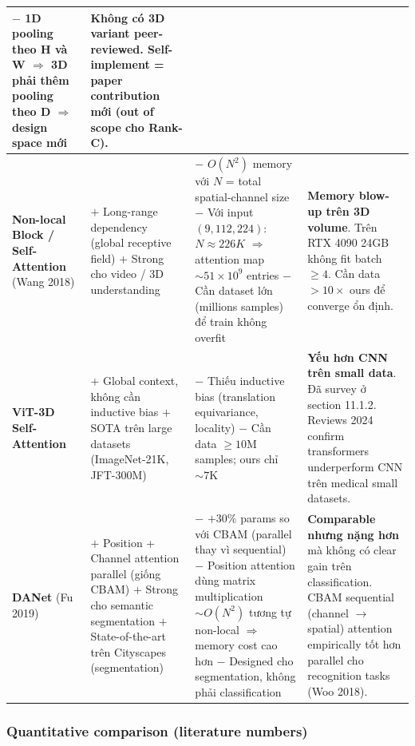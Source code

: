 \documentclass[11pt,a4paper]{article}
\newcommand{\bad}[1]{\textcolor{bad}{#1}}
\begin{document}
\begin{longtable}{@{}p{2.2cm}p{4.2cm}p{4.2cm}p{4cm}@{}}
$-$ 1D pooling theo H và W $\Rightarrow$ 3D phải thêm pooling theo D
$\Rightarrow$ design space mới
&
\textbf{Không có 3D variant peer-reviewed}. Self-implement = paper
contribution mới (out of scope cho Rank-C). \\
\midrule
\textbf{Non-local Block / Self-Attention} (Wang 2018) &
$+$ Long-range dependency (global receptive field) \newline
$+$ Strong cho video / 3D understanding
&
$-$ \bad{$O(N^2)$ memory} với $N$ = total spatial-channel size \newline
$-$ Với input $(9, 112, 224)$: $N \approx 226K$ $\Rightarrow$ attention
map $\sim 51 \times 10^9$ entries \newline
$-$ Cần dataset lớn (millions samples) để train không overfit
&
\textbf{Memory blow-up trên 3D volume}. Trên RTX 4090 24GB không fit
batch $\geq 4$. Cần data $> 10\times$ ours để converge ổn định. \\
\midrule
\textbf{ViT-3D Self-Attention} &
$+$ Global context, không cần inductive bias \newline
$+$ SOTA trên large datasets (ImageNet-21K, JFT-300M)
&
$-$ \bad{Thiếu inductive bias} (translation equivariance, locality) \newline
$-$ Cần data $\geq 10\text{M}$ samples; ours chỉ $\sim 7\text{K}$
&
\textbf{Yếu hơn CNN trên small data}. Đã survey ở section 11.1.2.
Reviews 2024 confirm transformers underperform CNN trên medical small
datasets. \\
\midrule
\textbf{DANet} (Fu 2019) &
$+$ Position + Channel attention parallel (giống CBAM) \newline
$+$ Strong cho semantic segmentation \newline
$+$ State-of-the-art trên Cityscapes (segmentation)
&
$-$ \bad{$+30\%$ params} so với CBAM (parallel thay vì sequential) \newline
$-$ Position attention dùng matrix multiplication
$\sim O(N^2)$ tương tự non-local $\Rightarrow$ memory cost cao hơn \newline
$-$ Designed cho segmentation, không phải classification
&
\textbf{Comparable nhưng nặng hơn} mà không có clear gain trên
classification. CBAM sequential (channel $\to$ spatial) attention
empirically tốt hơn parallel cho recognition tasks (Woo 2018). \\
\bottomrule
\end{longtable}

\subsubsection*{Quantitative comparison (literature numbers)}
\end{document}
